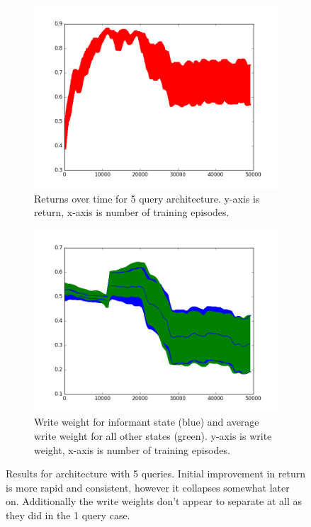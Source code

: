 \documentclass{article}
\begin{document}
\begin{figure}[!ht]
\centering
\begin{subfigure}[t]{.45\textwidth}
  \centering
      \includegraphics[width=1\textwidth]{images/5_query_mem_ret.png}
  \caption{Returns over time for 5 query architecture. y-axis is return, x-axis is number of training episodes.}
  \label{fig:5_query_ret}
\end{subfigure}\hfill
\begin{subfigure}[t]{.45\textwidth}
  \centering
      \includegraphics[width=1\textwidth]{images/5_query_mem_writes.png}
  \caption{Write weight for informant state (blue) and average write weight for all other states (green). y-axis is write weight, x-axis is number of training episodes.}
  \label{fig:5_query_write}
\end{subfigure}
\caption{Results for architecture with 5 queries. Initial improvement in return is more rapid and consistent, however it collapses somewhat later on. Additionally the write weights don't appear to separate at all as they did in the 1 query case. }
\label{fig:5_query}
\end{figure}
\end{document}
